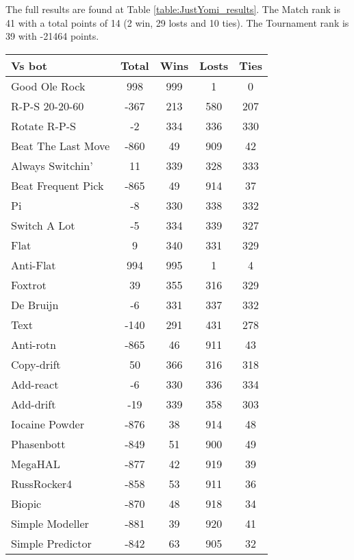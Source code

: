The full results are found at Table \ref{table:JustYomi_results}. The Match rank is 41 with a total points of 14 (2 win, 29 losts and 10 ties). The Tournament rank is 39 with -21464 points.

\begin{table*}
    \caption{Yomi - No Predictors results}
    \label{table:JustYomi_results}
    \centering
    \begin{tabular}{|l|c|c|c|c|}
        \hline
        \textbf{Vs bot} & \textbf{Total} & \textbf{Wins} & \textbf{Losts} & \textbf{Ties} \\ \hline
Good Ole Rock & 998 & 999 & 1 & 0 \\ \hline 
R-P-S 20-20-60 & -367 & 213 & 580 & 207 \\ \hline 
Rotate R-P-S & -2 & 334 & 336 & 330 \\ \hline 
Beat The Last Move & -860 & 49 & 909 & 42 \\ \hline 
Always Switchin' & 11 & 339 & 328 & 333 \\ \hline 
Beat Frequent Pick & -865 & 49 & 914 & 37 \\ \hline 
Pi & -8 & 330 & 338 & 332 \\ \hline 
Switch A Lot & -5 & 334 & 339 & 327 \\ \hline 
Flat & 9 & 340 & 331 & 329 \\ \hline 
Anti-Flat & 994 & 995 & 1 & 4 \\ \hline 
Foxtrot & 39 & 355 & 316 & 329 \\ \hline 
De Bruijn & -6 & 331 & 337 & 332 \\ \hline 
Text & -140 & 291 & 431 & 278 \\ \hline 
Anti-rotn & -865 & 46 & 911 & 43 \\ \hline 
Copy-drift & 50 & 366 & 316 & 318 \\ \hline 
Add-react & -6 & 330 & 336 & 334 \\ \hline 
Add-drift & -19 & 339 & 358 & 303 \\ \hline 
Iocaine Powder & -876 & 38 & 914 & 48 \\ \hline 
Phasenbott & -849 & 51 & 900 & 49 \\ \hline 
MegaHAL & -877 & 42 & 919 & 39 \\ \hline 
RussRocker4 & -858 & 53 & 911 & 36 \\ \hline 
Biopic & -870 & 48 & 918 & 34 \\ \hline 
Simple Modeller & -881 & 39 & 920 & 41 \\ \hline 
Simple Predictor & -842 & 63 & 905 & 32 \\ \hline 

\end{tabular}
\end{table*}

